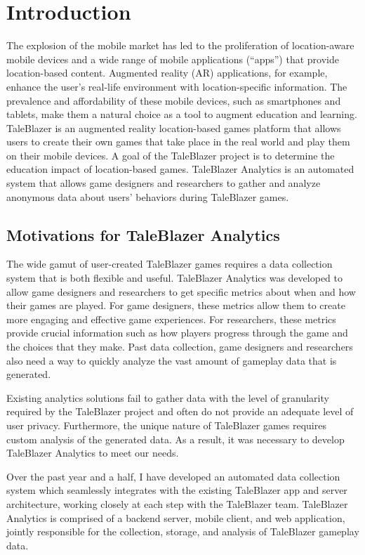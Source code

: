 \chapter{Introduction}

The explosion of the mobile market has led to the proliferation of location-aware mobile devices and a wide range of mobile applications (``apps'') that provide location-based content. Augmented reality (AR) applications, for example, enhance the user's real-life environment with location-specific information. The prevalence and affordability of these mobile devices, such as smartphones and tablets, make them a natural choice as a tool to augment education and learning. TaleBlazer is an augmented reality location-based games platform that allows users to create their own games that take place in the real world and play them on their mobile devices. A goal of the TaleBlazer project is to determine the education impact of location-based games. TaleBlazer Analytics is an automated system that allows game designers and researchers to gather and analyze anonymous data about users' behaviors during TaleBlazer games. 

\section{Motivations for TaleBlazer Analytics}
The wide gamut of user-created TaleBlazer games requires a data collection system that is both flexible and useful. TaleBlazer Analytics was developed to allow game designers and researchers to get specific metrics about when and how their games are played. For game designers, these metrics allow them to create more engaging and effective game experiences. For researchers, these metrics provide crucial information such as how players progress through the game and the choices that they make. Past data collection, game designers and researchers also need a way to quickly analyze the vast amount of gameplay data that is generated. 

Existing analytics solutions fail to gather data with the level of granularity required by the TaleBlazer project and often do not provide an adequate level of user privacy. Furthermore, the unique nature of TaleBlazer games requires custom analysis of the generated data. As a result, it was necessary to develop TaleBlazer Analytics to meet our needs. 

Over the past year and a half, I have developed an automated data collection system which seamlessly integrates with the existing TaleBlazer app and server architecture, working closely at each step with the TaleBlazer team. TaleBlazer Analytics is comprised of a backend server, mobile client, and web application, jointly responsible for the collection, storage, and analysis of TaleBlazer gameplay data. 

